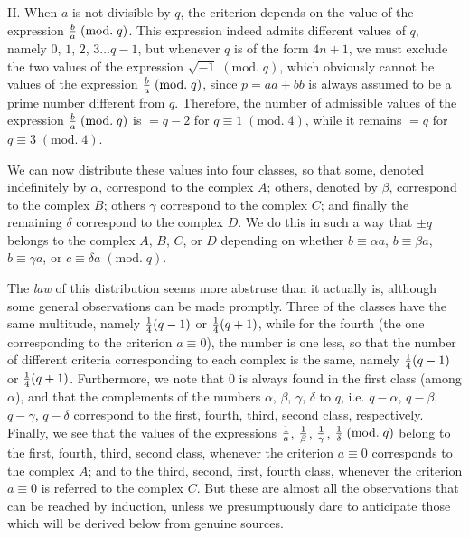 \documentclass[twoside,12pt]{memoir}
\renewcommand{\pmod}[1]{\;(\textrm{mod.}\;#1)}
\let\oldfrac\frac
\def\frac#1#2{\mathchoice{\tfrac{#1}{#2}}{\oldfrac{#1}{#2}}{\genfrac{}{}{}{2}{#1}{#2\mathstrut}}{\genfrac{}{}{}{3}{#1}{#2\mathstrut}}}
\begin{document}
II. When \(a\) is not divisible by \(q\), the criterion depends on the value of the expression \(\frac{b}{a}\pmod{q}\). This expression indeed admits different values of \(q\), namely \(0\), \(1\), \(2\), \(3\ldots q-1\), but whenever \(q\) is of the form \(4n+1\), we must exclude the two values of the expression \(\sqrt{-1}\pmod{q}\), which obviously cannot be values of the expression \(\frac{b}{a}\pmod{q}\), since \(p=a a+b b\) is always assumed to be a prime number different from \(q\). Therefore, the number of admissible values of the expression \(\frac{b}{a}\pmod{q}\) is \(=q-2\) for \(q \equiv 1\pmod{4}\), while it remains \(=q\) for \(q \equiv 3\pmod{4}\).
%

We can now distribute these values into four classes, so that some, denoted indefinitely by \(\alpha\), correspond to the complex \(A\); others, denoted by \(\beta\), correspond to the complex \(B\); others \(\gamma\) correspond to the complex \(C\); and finally the remaining \(\delta\) correspond to the complex \(D\).  We do this in such a way that \(\pm q\) belongs to the complex \(A\), \(B\), \(C\), or \(D\) depending on whether \(b \equiv \alpha a\), \(b \equiv \beta a\), \(b \equiv \gamma a\), or \(c \equiv \delta a\pmod{q}\).
%

The \textit{law} of this distribution seems more abstruse than it actually is, although some general observations can be made promptly. Three of the classes have the same multitude, namely \(\frac{1}{4}(q-1)\) or \(\frac{1}{4}(q+1)\), while for the fourth (the one corresponding to the criterion \(a \equiv 0\)), the number is one less, so that the number of different criteria corresponding to each complex is the same, namely \(\frac{1}{4}(q-1)\) or \(\frac{1}{4}(q+1)\). Furthermore, we note that \(0\) is always found in the first class (among \(\alpha\)), and that the complements of the numbers \(\alpha\), \(\beta\), \(\gamma\), \(\delta\) to \(q\), i{.}e{.} \(q-\alpha\), \(q-\beta\), \(q-\gamma\), \(q-\delta\) correspond to the first, fourth, third, second class, respectively. Finally, we see that the values of the expressions \(\frac{1}{a}\), \(\frac{1}{\beta}\), \(\frac{1}{\gamma}\), \(\frac{1}{\delta} \pmod{q}\) belong to the first, fourth, third, second class, whenever the criterion \(a \equiv 0\) corresponds to the complex \(A\); and to the third, second, first, fourth class, whenever the criterion \(a \equiv 0\) is referred to the complex \(C\). But these are almost all the observations that can be reached by induction, unless we presumptuously dare to anticipate those which will be derived below from genuine sources.
%
\end{document}

